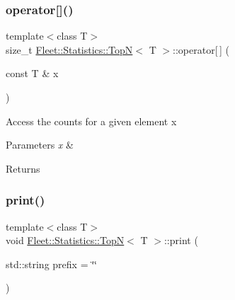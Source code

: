 \mbox{\label{class_fleet_1_1_statistics_1_1_top_n_acb11e623b45dbec10f2c1ac9a48b0eef}} 
\subsubsection{\texorpdfstring{operator[]()}{operator[]()}}
{\footnotesize\ttfamily template$<$class T$>$ \\
size\+\_\+t \hyperlink{class_fleet_1_1_statistics_1_1_top_n}{Fleet\+::\+Statistics\+::\+TopN}$<$ T $>$\+::operator\mbox{[}$\,$\mbox{]} (\begin{DoxyParamCaption}\item[{const T \&}]{x }\end{DoxyParamCaption})\hspace{0.3cm}{\ttfamily [inline]}}

Access the counts for a given element x 
\begin{DoxyParams}{Parameters}
{\em x} & \\
\hline
\end{DoxyParams}
\begin{DoxyReturn}{Returns}

\end{DoxyReturn}
\mbox{\label{class_fleet_1_1_statistics_1_1_top_n_ae37eb4f39eb12d32a1f04aa30276da86}} 
\subsubsection{\texorpdfstring{print()}{print()}}
{\footnotesize\ttfamily template$<$class T$>$ \\
void \hyperlink{class_fleet_1_1_statistics_1_1_top_n}{Fleet\+::\+Statistics\+::\+TopN}$<$ T $>$\+::print (\begin{DoxyParamCaption}\item[{std\+::string}]{prefix = {\ttfamily \char`\"{}\char`\"{}} }\end{DoxyParamCaption})\hspace{0.3cm}{\ttfamily [inline]}}

